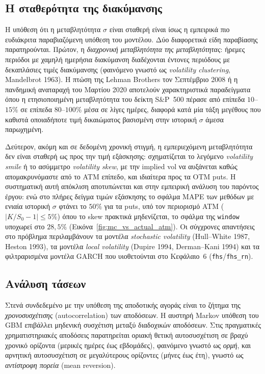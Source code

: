 \documentclass[12pt]{article}
\begin{document}
\subsection{Η σταθερότητα της διακύμανσης}

Η υπόθεση ότι η μεταβλητότητα $\sigma$ είναι σταθερή είναι ίσως η εμπειρικά πιο ευδιάκριτα παραβιαζόμενη υπόθεση του μοντέλου. Δύο διαφορετικά είδη παραβίασης παρατηρούνται. Πρώτον, η \emph{διαχρονική μεταβλητότητα της μεταβλητότητας}: ήρεμες περιόδοι με χαμηλή ημερήσια διακύμανση διαδέχονται έντονες περιόδους με δεκαπλάσιες τιμές διακύμανσης (φαινόμενο γνωστό ως \emph{volatility clustering}, Mandelbrot 1963). Η πτώση της Lehman Brothers τον Σεπτέμβριο 2008 ή η πανδημική αναταραχή του Μαρτίου 2020 αποτελούν χαρακτηριστικά παραδείγματα όπου η ετησιοποιημένη μεταβλητότητα του δείκτη S\&P~500 πέρασε από επίπεδα $10$--$15\%$ σε επίπεδα $80$--$100\%$ μέσα σε λίγες ημέρες, διαφορά κατά μία τάξη μεγέθους που καθιστά οποιαδήποτε τιμή δικαιώματος βασισμένη στην ιστορική $\sigma$ άμεσα παρωχημένη.

Δεύτερον, ακόμη και σε δεδομένη χρονική στιγμή, η εμπεριεχόμενη μεταβλητότητα δεν είναι σταθερή ως προς την τιμή εξάσκησης: σχηματίζεται το λεγόμενο \emph{volatility smile} ή το ασύμμετρο \emph{volatility skew}, με την implied vol να αυξάνεται καθώς απομακρυνόμαστε από το ATM επίπεδο, και ιδιαίτερα προς τα OTM puts. Η συστηματική αυτή απόκλιση αποτυπώνεται και στην εμπειρική ανάλυση του παρόντος έργου: ενώ στο πλήρες δείγμα τιμών εξάσκησης το σφάλμα MAPE των μεθόδων με ενιαία ιστορική $\sigma$ φτάνει το $50\%$ για τα puts, υπό τον περιορισμό ATM ($|K/S_0 - 1| \leq 5\%$) όπου το skew πρακτικά μηδενίζεται, το σφάλμα της \texttt{window} υποχωρεί στο $28{,}5\%$ (Εικόνα~\ref{fig:mc_vs_actual_atm}). Οι σύγχρονες απαντήσεις στο πρόβλημα περιλαμβάνουν τα μοντέλα \emph{stochastic volatility} (Hull–White 1987, Heston 1993), τα μοντέλα \emph{local volatility} (Dupire 1994, Derman–Kani 1994) και τα φιλτραρισμένα μοντέλα GARCH που υιοθετούνται στο Κεφάλαιο~6 (\texttt{fhs}/\texttt{fhs\_rn}).

\subsection{Ανάλυση τάσεων}

Στενά συνδεδεμένο με την υπόθεση της αποδοτικής αγοράς είναι το ζήτημα της \emph{χρονοσυσχέτισης} (autocorrelation) των αποδόσεων. Η αυστηρή Markov υπόθεση του GBM επιβάλλει μηδενική συσχέτιση μεταξύ διαδοχικών αποδόσεων. Στις πραγματικές χρηματιστηριακές αποδόσεις παρατηρείται οριακή θετική αυτοσυσχέτιση σε βραχύ χρονικό ορίζοντα (μερικές ημέρες έως εβδομάδες), φαινόμενο γνωστό ως \emph{ορμή}, και αρνητική αυτοσυσχέτιση σε μεγαλύτερους ορίζοντες (μήνες έως έτη), γνωστό ως \emph{αντίστροφη πορεία} (mean reversion).
\end{document}
